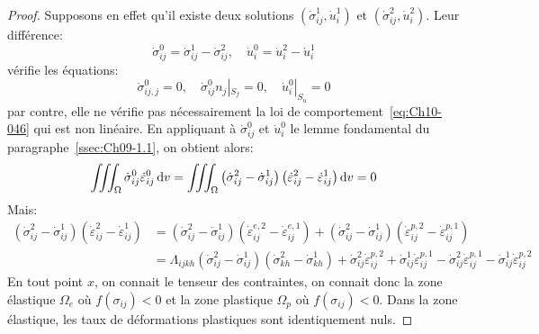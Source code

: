 \begin{proof}
    Supposons en effet qu'il existe deux solutions $\left( \dot{\sigma}_{ij}^1, \dot{u}_i^1 \right)$ et $\left( \dot{\sigma}_{ij}^2, \dot{u}_i^2 \right)$.
    Leur différence:
    \begin{equation}
        \dot{\sigma}_{ij}^0 = \dot{\sigma}_{ij}^1 -  \dot{\sigma}_{ij}^2, \quad \dot{u}_i^0 = \dot{u}_i^2 - \dot{u}_i^1
        \label{eq:Ch10-047}
    \end{equation}
    vérifie les équations:
    \begin{equation}
        \dot{\sigma}_{ij,j}^0 = 0, \quad \dot{\sigma}_{ij}^0 n_j|_{S_f} = 0, \quad \dot{u}_i^0 |_{S_u} = 0
        \label{eq:Ch10-048}
    \end{equation}
    par contre, elle ne vérifie pas nécessairement la loi de comportement~\eqref{eq:Ch10-046} qui est non linéaire.
    En appliquant à $\dot{\sigma}_{ij}^0$ et $\dot{u}_i^0$ le lemme fondamental du paragraphe~\ref{ssec:Ch09-1.1}, on obtient alors: 
    \begin{equation}
        \iiint_{\Omega} \dot{\sigma}_{ij}^0 \dot{\varepsilon}_{ij}^0 \mathop{\mathrm{{}d}}\mathopen{} v = \iiint_{\Omega} \left( \dot{\sigma}_{ij}^2 - \dot{\sigma}_{ij}^1 \right)\left( \dot{\varepsilon}_{ij}^2 - \dot{\varepsilon}_{ij}^1 \right) \mathop{\mathrm{{}d}}\mathopen{} v = 0
        \label{eq:Ch10-049}
    \end{equation}
    Mais:
    \[
    \begin{aligned}
        \left( \dot{\sigma}_{ij}^2 - \dot{\sigma}_{ij}^1 \right)\left( \dot{\varepsilon}_{ij}^2 - \dot{\varepsilon}_{ij}^1 \right) & = \left( \dot{\sigma}_{ij}^2 - \dot{\sigma}_{ij}^1 \right) \left( \dot{\varepsilon}_{ij}^{e,2} - \dot{\varepsilon}_{ij}^{e,1} \right) + \left( \dot{\sigma}_{ij}^2 - \dot{\sigma}_{ij}^1 \right)\left( \dot{\varepsilon}_{ij}^{p,2} - \dot{\varepsilon}_{ij}^{p,1} \right) \\
        & = \Lambda_{ijkh} \left( \dot{\sigma}_{ij}^2 - \dot{\sigma}_{ij}^1 \right) \left( \dot{\sigma}_{kh}^2 - \dot{\sigma}_{kh}^1 \right) + \dot{\sigma}_{ij}^2 \dot{\varepsilon}_{ij}^{p,2} + \dot{\sigma}_{ij}^1 \dot{\varepsilon}_{ij}^{p,1} - \dot{\sigma}_{ij}^2 \dot{\varepsilon}_{ij}^{p,1} - \dot{\sigma}_{ij}^1 \dot{\varepsilon}_{ij}^{p,2}
    \end{aligned}
    \]
    En tout point $x$, on connait le tenseur des contraintes, on connait donc la zone élastique $\Omega_e$ où $f\left( \sigma_{ij} \right) < 0$ et la zone plastique $\Omega_p$ où $f\left( \sigma_{ij} \right) < 0$. 
    Dans la zone élastique, les taux de déformations plastiques sont identiquement nuls.

\end{proof}
